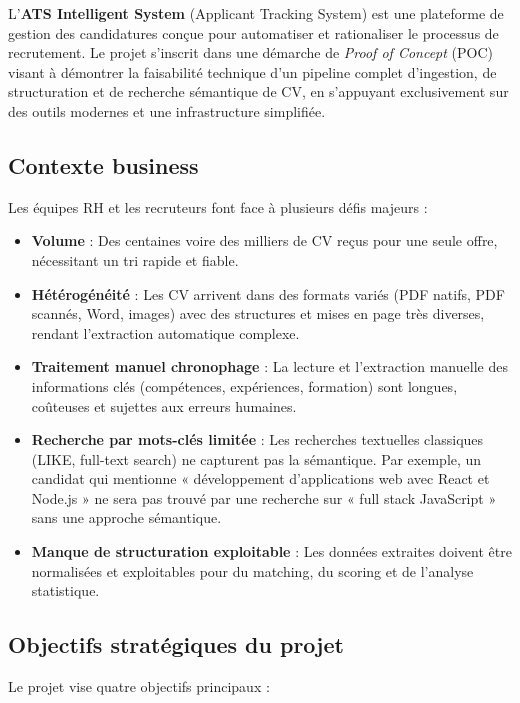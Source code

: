 \documentclass[11pt,a4paper]{report}
\begin{document}
L'\textbf{ATS Intelligent System} (Applicant Tracking System) est une plateforme de gestion des candidatures conçue pour automatiser et rationaliser le processus de recrutement. Le projet s'inscrit dans une démarche de \textit{Proof of Concept} (POC) visant à démontrer la faisabilité technique d'un pipeline complet d'ingestion, de structuration et de recherche sémantique de CV, en s'appuyant exclusivement sur des outils modernes et une infrastructure simplifiée.

\subsection{Contexte business}

Les équipes RH et les recruteurs font face à plusieurs défis majeurs :

\begin{itemize}[leftmargin=*]
  \item \textbf{Volume} : Des centaines voire des milliers de CV reçus pour une seule offre, nécessitant un tri rapide et fiable.
  \item \textbf{Hétérogénéité} : Les CV arrivent dans des formats variés (PDF natifs, PDF scannés, Word, images) avec des structures et mises en page très diverses, rendant l'extraction automatique complexe.
  \item \textbf{Traitement manuel chronophage} : La lecture et l'extraction manuelle des informations clés (compétences, expériences, formation) sont longues, coûteuses et sujettes aux erreurs humaines.
  \item \textbf{Recherche par mots-clés limitée} : Les recherches textuelles classiques (LIKE, full-text search) ne capturent pas la sémantique. Par exemple, un candidat qui mentionne « développement d'applications web avec React et Node.js » ne sera pas trouvé par une recherche sur « full stack JavaScript » sans une approche sémantique.
  \item \textbf{Manque de structuration exploitable} : Les données extraites doivent être normalisées et exploitables pour du matching, du scoring et de l'analyse statistique.
\end{itemize}

\subsection{Objectifs stratégiques du projet}

Le projet vise quatre objectifs principaux :
\end{document}
